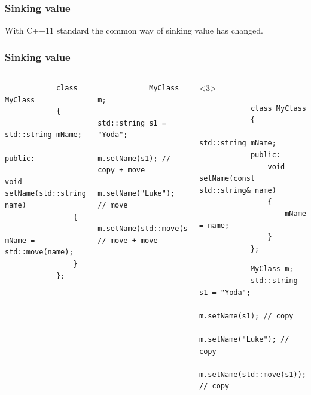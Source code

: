 \documentclass{beamer}
\begin{document}
\begin{frame}
\frametitle{Sinking value}
    \begin{center}
        With C++11 standard the common way of sinking value has changed.
    \end{center}
\end{frame}

\begin{frame}[fragile,t]
\frametitle{Sinking value}
	\begin{columns}[T]
        \begin{lstlisting}
            class MyClass
            {
                std::string mName;
            public:		
                void setName(std::string name) 
                {
                    mName = std::move(name);
                }
            };	
        \end{lstlisting}
        \hrulefill
        \begin{lstlisting}
            MyClass m;
            std::string s1 = "Yoda";
            m.setName(s1); // copy + move
            m.setName("Luke"); // move
            m.setName(std::move(s1)); // move + move
        \end{lstlisting}
        \begin{onlyenv}<3>
        \begin{lstlisting}
            class MyClass
            {
                std::string mName;
            public:		
                void setName(const std::string& name) 
                {
                    mName = name;
                }
            };	
        \end{lstlisting}
        \hrulefill
        \begin{lstlisting}
            MyClass m;
            std::string s1 = "Yoda";
            m.setName(s1); // copy
            m.setName("Luke"); // copy
            m.setName(std::move(s1)); // copy
        \end{lstlisting}
        \end{onlyenv}
	\end{columns}

\end{frame}
\end{document}
